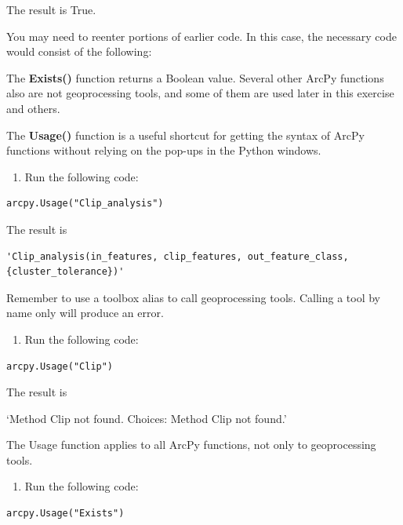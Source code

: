 \documentclass[]{article}
\providecommand{\tightlist}{%
  \setlength{\itemsep}{0pt}\setlength{\parskip}{0pt}}
\begin{document}
The result is True.

You may need to reenter portions of earlier code. In this case, the
necessary code would consist of the following:

The \textbf{Exists()} function returns a Boolean value. Several other
ArcPy functions also are not geoprocessing tools, and some of them are
used later in this exercise and others.

The \textbf{Usage()} function is a useful shortcut for getting the
syntax of ArcPy functions without relying on the pop-ups in the Python
windows.

\begin{enumerate}
\def\labelenumi{\arabic{enumi}.}
\setcounter{enumi}{1}
\tightlist
\item
  Run the following code:
\end{enumerate}

\begin{verbatim}
arcpy.Usage("Clip_analysis")
\end{verbatim}

The result is

\begin{verbatim}
'Clip_analysis(in_features, clip_features, out_feature_class, {cluster_tolerance})'
\end{verbatim}

Remember to use a toolbox alias to call geoprocessing tools. Calling a
tool by name only will produce an error.

\begin{enumerate}
\def\labelenumi{\arabic{enumi}.}
\setcounter{enumi}{2}
\tightlist
\item
  Run the following code:
\end{enumerate}

\begin{verbatim}
arcpy.Usage("Clip")
\end{verbatim}

The result is

`Method Clip not found. Choices: Method Clip not found.'

The Usage function applies to all ArcPy functions, not only to
geoprocessing tools.

\begin{enumerate}
\def\labelenumi{\arabic{enumi}.}
\setcounter{enumi}{3}
\tightlist
\item
  Run the following code:
\end{enumerate}

\begin{verbatim}
arcpy.Usage("Exists")
\end{verbatim}
\end{document}
